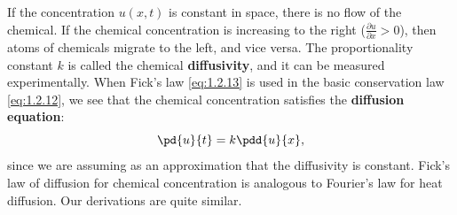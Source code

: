 If the concentration $u(x,t)$ is constant in space, there is no flow of the chemical. If the chemical concentration is increasing to the right ($\frac{\partial u}{\partial x} > 0$), then atoms of chemicals migrate to the left, and vice versa. The proportionality constant $k$ is called the chemical \textbf{diffusivity}, and it can be measured experimentally. When Fick's law \eqref{eq:1.2.13} is used in the basic conservation law \eqref{eq:1.2.12}, we see that the chemical concentration satisfies the \textbf{diffusion equation}:
\begin{equation}
\pd{u}{t} = k\pdd{u}{x},
\label{eq:1.2.14}
\end{equation}
since we are assuming as an approximation that the diffusivity is constant. Fick's law of diffusion for chemical concentration is analogous to Fourier's law for heat diffusion. Our derivations are quite similar.

